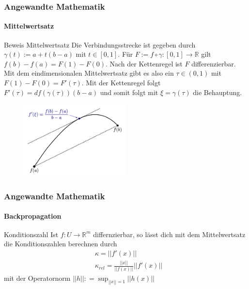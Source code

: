 \documentclass{beamer}
\begin{document}
\begin{frame}
    \frametitle{Angewandte Mathematik}
\framesubtitle{Mittelwertsatz}
    \begin{block}{Beweis Mittelwertsatz}
Die Verbindungsstrecke ist gegeben durch $\gamma(t) := a + t(b-a)$ mit $t \in [0,1]$. 
Für $F:= f \circ \gamma : [0,1] \to \mathbb{R}$ gilt $f(b) - f(a)= F(1) - F(0)$.
Nach der Kettenregel ist $F$ differenzierbar. Mit dem eindimensionalen Mittelwertsatz gibt es also ein $\tau \in (0,1)$ mit
$F(1) - F(0) = F'(\tau)$. Mit der Kettenregel folgt $F'(\tau) = df(\gamma(\tau)) (b-a)$ und somit folgt mit $\xi= \gamma(\tau)$ die Behauptung.
\end{block}



\begin{figure}[H]
    \centering
  \includegraphics[width=0.5\textwidth]{images/Mittelwertsatz3.png}
\end{figure}

 \end{frame}



 \begin{frame}
    \frametitle{Angewandte Mathematik}
\framesubtitle{Backpropagation}
    \begin{block}{Konditionszahl}
Ist $f : U \to \mathbb{R}^m$ differnzierbar, so lässt dich mit dem Mittelwertsatz die Konditionszahlen berechnen durch
\begin{align*}
& \kappa = || f'(x) || \\
& \kappa_{rel} = \frac{||x||}{|| f(x)||} ||f'(x) ||
\end{align*}
mit der Operatornorm 
$||h|| : = \sup_{||x|| =  1} ||h(x)||$

\end{block}
 \end{frame}
\end{document}
